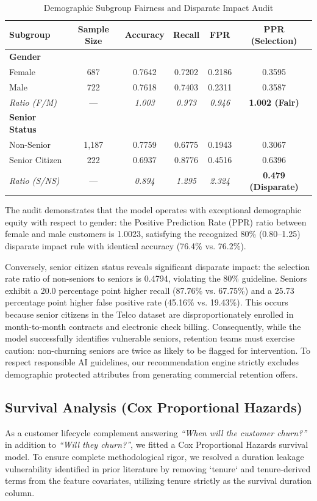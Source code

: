 \documentclass[conference]{IEEEtran}
\begin{document}
\begin{table}[htbp]
\caption{Demographic Subgroup Fairness and Disparate Impact Audit}
\label{tab:fairness}
\centering
\begin{tabular}{lccccc}
\toprule
\textbf{Subgroup} & \textbf{Sample Size} & \textbf{Accuracy} & \textbf{Recall} & \textbf{FPR} & \textbf{PPR (Selection)} \\
\midrule
\textbf{Gender} & & & & & \\
Female & 687 & 0.7642 & 0.7202 & 0.2186 & 0.3595 \\
Male & 722 & 0.7618 & 0.7403 & 0.2311 & 0.3587 \\
\textit{Ratio (F/M)} & --- & \textit{1.003} & \textit{0.973} & \textit{0.946} & \textbf{1.002 (Fair)} \\
\midrule
\textbf{Senior Status} & & & & & \\
Non-Senior & 1,187 & 0.7759 & 0.6775 & 0.1943 & 0.3067 \\
Senior Citizen & 222 & 0.6937 & 0.8776 & 0.4516 & 0.6396 \\
\textit{Ratio (S/NS)} & --- & \textit{0.894} & \textit{1.295} & \textit{2.324} & \textbf{0.479 (Disparate)} \\
\bottomrule
\end{tabular}
\end{table}

The audit demonstrates that the model operates with exceptional demographic equity with respect to gender: the Positive Prediction Rate (PPR) ratio between female and male customers is 1.0023, satisfying the recognized 80\% (0.80--1.25) disparate impact rule with identical accuracy (76.4\% vs. 76.2\%). 

Conversely, senior citizen status reveals significant disparate impact: the selection rate ratio of non-seniors to seniors is 0.4794, violating the 80\% guideline. Seniors exhibit a 20.0 percentage point higher recall (87.76\% vs. 67.75\%) and a 25.73 percentage point higher false positive rate (45.16\% vs. 19.43\%). This occurs because senior citizens in the Telco dataset are disproportionately enrolled in month-to-month contracts and electronic check billing. Consequently, while the model successfully identifies vulnerable seniors, retention teams must exercise caution: non-churning seniors are twice as likely to be flagged for intervention. To respect responsible AI guidelines, our recommendation engine strictly excludes demographic protected attributes from generating commercial retention offers.

\subsection{Survival Analysis (Cox Proportional Hazards)}
As a customer lifecycle complement answering \textit{``When will the customer churn?''} in addition to \textit{``Will they churn?''}, we fitted a Cox Proportional Hazards survival model. To ensure complete methodological rigor, we resolved a duration leakage vulnerability identified in prior literature by removing `tenure` and tenure-derived terms from the feature covariates, utilizing tenure strictly as the survival duration column.
\end{document}
